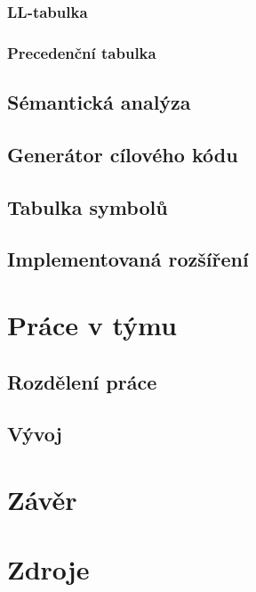 \documentclass[11pt,a4paper]{article}
\begin{document}
        \subsubsection{LL-tabulka}
        \subsubsection{Precedenční tabulka}
    \subsection{Sémantická analýza}
    \subsection{Generátor cílového kódu}
    \subsection{Tabulka symbolů}
    \subsection{Implementovaná rozšíření}
\section{Práce v týmu}
\subsection{Rozdělení práce}
\subsection{Vývoj}
\section{Závěr}

\newpage

\section{Zdroje}
    
    
\end{document}
